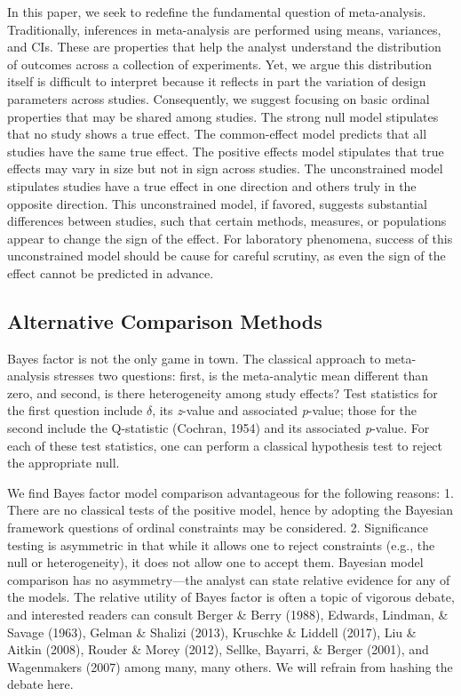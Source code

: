\documentclass[english,man]{apa6}
\theoremstyle{definition}
\theoremstyle{definition}
\theoremstyle{remark}
\begin{document}
In this paper, we seek to redefine the fundamental question of
meta-analysis. Traditionally, inferences in meta-analysis are performed
using means, variances, and CIs. These are properties that help the
analyst understand the distribution of outcomes across a collection of
experiments. Yet, we argue this distribution itself is difficult to
interpret because it reflects in part the variation of design parameters
across studies. Consequently, we suggest focusing on basic ordinal
properties that may be shared among studies. The strong null model
stipulates that no study shows a true effect. The common-effect model
predicts that all studies have the same true effect. The positive
effects model stipulates that true effects may vary in size but not in
sign across studies. The unconstrained model stipulates studies have a
true effect in one direction and others truly in the opposite direction.
This unconstrained model, if favored, suggests substantial differences
between studies, such that certain methods, measures, or populations
appear to change the sign of the effect. For laboratory phenomena,
success of this unconstrained model should be cause for careful
scrutiny, as even the sign of the effect cannot be predicted in advance.

\subsection{Alternative Comparison
Methods}\label{alternative-comparison-methods}

Bayes factor is not the only game in town. The classical approach to
meta-analysis stresses two questions: first, is the meta-analytic mean
different than zero, and second, is there heterogeneity among study
effects? Test statistics for the first question include \(\delta\), its
\emph{z}-value and associated \emph{p}-value; those for the second
include the Q-statistic (Cochran, 1954) and its associated
\emph{p}-value. For each of these test statistics, one can perform a
classical hypothesis test to reject the appropriate null.

We find Bayes factor model comparison advantageous for the following
reasons: 1. There are no classical tests of the positive model, hence by
adopting the Bayesian framework questions of ordinal constraints may be
considered. 2. Significance testing is asymmetric in that while it
allows one to reject constraints (e.g., the null or heterogeneity), it
does not allow one to accept them. Bayesian model comparison has no
asymmetry---the analyst can state relative evidence for any of the
models. The relative utility of Bayes factor is often a topic of
vigorous debate, and interested readers can consult Berger \& Berry
(1988), Edwards, Lindman, \& Savage (1963), Gelman \& Shalizi (2013),
Kruschke \& Liddell (2017), Liu \& Aitkin (2008), Rouder \& Morey
(2012), Sellke, Bayarri, \& Berger (2001), and Wagenmakers (2007) among
many, many others. We will refrain from hashing the debate here.
\end{document}
